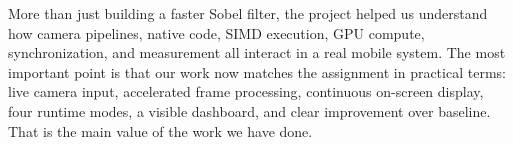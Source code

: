\documentclass[12pt,a4paper]{article}
\begin{document}
More than just building a faster Sobel filter, the project helped us understand how camera pipelines, native code, SIMD execution, GPU compute, synchronization, and measurement all interact in a real mobile system. The most important point is that our work now matches the assignment in practical terms: live camera input, accelerated frame processing, continuous on-screen display, four runtime modes, a visible dashboard, and clear improvement over baseline. That is the main value of the work we have done.
\end{document}
